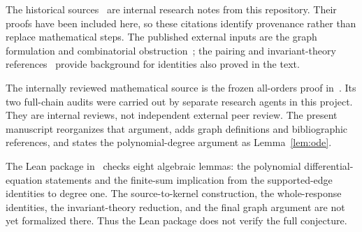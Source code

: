 \documentclass[11pt]{article}
\theoremstyle{definition}
\theoremstyle{plain}
\numberwithin{equation}{section}
\begin{document}
The historical sources~\cite{factors,mixed,pure,omission,diagonal,endpoint}
are internal research notes from this repository. Their proofs have been
included here, so these citations identify provenance rather than replace
mathematical steps. The published external inputs are the graph formulation
and combinatorial obstruction~\cite{kgs,cgi}; the pairing and invariant-theory
references~\cite{isserlis,kraft} provide background for identities also proved
in the text.

The internally reviewed mathematical source is the frozen all-orders proof
in~\cite{review}. Its two full-chain audits were carried out by separate
research agents in this project. They are internal reviews, not independent
external peer review. The present manuscript reorganizes that argument,
adds graph definitions and bibliographic references, and states the
polynomial-degree argument as Lemma~\ref{lem:ode}.

The Lean package in~\cite{lean} checks eight algebraic lemmas: the polynomial
differential-equation statements and the finite-sum implication from the
supported-edge identities to degree one. The source-to-kernel construction,
the whole-response identities, the invariant-theory reduction, and the final
graph argument are not yet formalized there. Thus the Lean package does not
verify the full conjecture.
\end{document}
